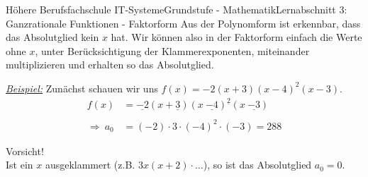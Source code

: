 \documentclass[11pt,twocolumn,oneside,openany,headings=optiontotoc,11pt,numbers=noenddot]{article}
\begin{document}
\begin{worksheet}{Höhere Berufsfachschule IT-Systeme}{Grundstufe - Mathematik}{Lernabschnitt 3: Ganzrationale Funktionen - Faktorform}
		Aus der Polynomform ist erkennbar, dass das Absolutglied kein \(x\) hat. Wir können also in der Faktorform einfach die Werte ohne \(x\), unter Berücksichtigung der Klammerexponenten, miteinander multiplizieren und erhalten so das Absolutglied.\\
		\par\noindent
		\textit{\underline{Beispiel:}} Zunächst schauen wir uns \(f(x) = -2(x+3)(x-4)^2(x-3)\).
		\begin{align*}
			f(x) & = \underline{-2}(x+\underline{3})(x\ \underline{-4})^{\underline{2}}(x\ \underline{-3})\\
			\\
			\Rightarrow\ a_0 & = (-2)\cdot{}3\cdot{}(-4)^2\cdot{}(-3) = 288
		\end{align*}
		\begin{framed}
			\color{red}Vorsicht!\\
			\normalcolor
			Ist ein \(x\) ausgeklammert (z.B. \(3x(x+2)\cdot\ldots\)), so ist das Absolutglied \(a_0 = 0\).
		\end{framed}

\end{worksheet}
\end{document}
